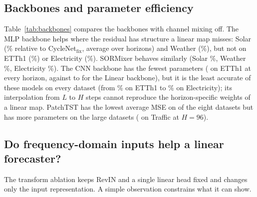 \documentclass[11pt,a4paper]{article}
\begin{document}
\begin{table}[t]
\centering
\scriptsize
\setlength{\tabcolsep}{3pt}

\caption{\textbf{Automatic channel mixing versus forced channel independence.} Mean relative MSE change over the four horizons when mixing is on (negative: mixing helps), with (horizons where mixing is better / horizons compared; significantly better $\uparrow$, significantly worse $\downarrow$).}
\label{tab:mixing}
\end{table}

\subsection{Backbones and parameter efficiency}
\label{sec:res-backbone}
Table~\ref{tab:backbones} compares the backbones with channel mixing off. The MLP backbone helps where the residual has structure a linear map misses: Solar (\vBbMlpSolar\% relative to CycleNet$_{\text{fix}}$, average over horizons) and Weather (\vBbMlpWeather\%), but not on ETTh1 (\vBbMlpETThOne\%) or Electricity (\vBbMlpElectricity\%). SORMixer behaves similarly (Solar \vBbSorSolar\%, Weather \vBbSorWeather\%, Electricity \vBbSorElectricity\%). The CNN backbone has the fewest parameters (\vParamCnnETThOne{} on ETTh1 at every horizon, against \vParamLinETThOne{} to \vParamLinETThOneL{} for the Linear backbone), but it is the least accurate of these models on every dataset (from \vBbCnnETThOne\% on ETTh1 to \vBbCnnElectricity\% on Electricity); its interpolation from $L$ to $H$ steps cannot reproduce the horizon-specific weights of a linear map. PatchTST has the lowest average MSE on \vBbPatchBestCount{} of the eight datasets but has more parameters on the large datasets (\vParamPatchTraffic{} on Traffic at $H=96$).

\begin{table}[t]
\centering
\scriptsize
\setlength{\tabcolsep}{2.5pt}
\resizebox{\columnwidth}{!}{}
\caption{\textbf{Backbones with channel mixing off.} Top: average test MSE over the four horizons. Bottom: trainable parameters (CycleNet$_{\text{fix}}$ and Pro-Lin$_{\text{CI}}$ differ in the size of the cycle tables only).}
\label{tab:backbones}
\end{table}

\subsection{Do frequency-domain inputs help a linear forecaster?}
\label{sec:res-transform}
The transform ablation keeps RevIN and a single linear head fixed and changes only the input representation. A simple observation constrains what it can show.
\end{document}
